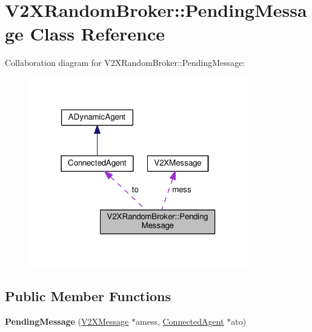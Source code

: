\hypertarget{classV2XRandomBroker_1_1PendingMessage}{}\section{V2\+X\+Random\+Broker\+:\+:Pending\+Message Class Reference}
\label{classV2XRandomBroker_1_1PendingMessage}


Collaboration diagram for V2\+X\+Random\+Broker\+:\+:Pending\+Message\+:
\nopagebreak
\begin{figure}[H]
\begin{center}
\leavevmode
\includegraphics[width=271pt]{classV2XRandomBroker_1_1PendingMessage__coll__graph}
\end{center}
\end{figure}
\subsection*{Public Member Functions}
\begin{DoxyCompactItemize}
\item 
{\bfseries Pending\+Message} (\hyperlink{classV2XMessage}{V2\+X\+Message} $\ast$amess, \hyperlink{classConnectedAgent}{Connected\+Agent} $\ast$ato)\hypertarget{classV2XRandomBroker_1_1PendingMessage_ab6026c704fc248191cf466f43151b366}{}\label{classV2XRandomBroker_1_1PendingMessage_ab6026c704fc248191cf466f43151b366}

\end{DoxyCompactItemize}
